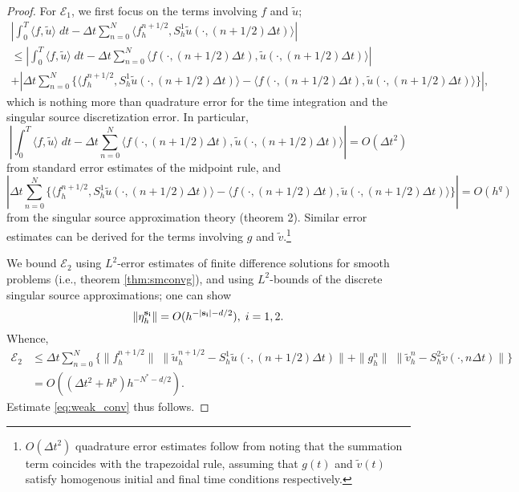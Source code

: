 \begin{proof}
For $\mathcal E_1$, we first focus on the terms involving $f$ and $\tilde u$;
\begin{equation*}
\begin{split}
	\left| \int_0^T \langle f, \tilde u\rangle \;  dt -
		\Delta t \sum_{n=0}^N \langle f_h^{n+1/2}, S_{h}^1\tilde u(\cdot,(n+1/2)\Delta t)\rangle \right| \\
	\le
	\left| \int_0^T \langle f,\tilde u \rangle \; dt - \Delta t \sum_{n=0}^N \langle f(\cdot,(n+1/2)\Delta t),\tilde u(\cdot,(n+1/2)\Delta t)\rangle \right| \\
	+ \left| \Delta t \sum_{n=0}^N \Big\{ \langle f_h^{n+1/2}, S_{h}^1\tilde u(\cdot,(n+1/2)\Delta t)\rangle - 
							     \langle f(\cdot,(n+1/2)\Delta t), \tilde u(\cdot,(n+1/2)\Delta t) \rangle \Big\} \right |,
\end{split}
\end{equation*}
which is nothing more than quadrature error for the time integration and the singular source discretization error.
In particular,
\[
	\left| \int_0^T \langle f,\tilde u \rangle \; dt - \Delta t \sum_{n=0}^N \langle f(\cdot,(n+1/2)\Delta t),\tilde u(\cdot,(n+1/2)\Delta t)\rangle \right| = O(\Delta t^2)
\]
from standard error estimates of the midpoint rule, and
\[
	\left| \Delta t \sum_{n=0}^N \Big\{ \langle f_h^{n+1/2}, S_{h}^1\tilde u(\cdot,(n+1/2)\Delta t)\rangle - 
							     \langle f(\cdot,(n+1/2)\Delta t), \tilde u(\cdot,(n+1/2)\Delta t) \rangle \Big\} \right |
	= O(h^q)
\]
from the singular source approximation theory (theorem 2).
Similar error estimates can be derived for the terms involving $g$ and $\tilde v$.\footnote{$O(\Delta t^2)$ quadrature error estimates follow from noting that the summation term coincides with the trapezoidal rule, assuming that $g(t)$ and $\tilde v(t)$ satisfy homogenous initial and final time conditions respectively.}

We bound $\mathcal E_2$ using $L^2$-error estimates of finite difference solutions for smooth problems (i.e., theorem \ref{thm:smconvg}), and using $L^2$-bounds of the discrete singular source approximations; one can show
\[
 	\| \eta_h^{\bf s_{\bf i}}\| = O(h^{-|{\bf s_{\bf i}}|-d/2}), \; i=1,2.
\]
Whence,
\begin{equation*}
\begin{split}
	\mathcal E_2 &\le \Delta t \sum_{n=0}^N \Big\{ \|f_h^{n+1/2}\| \; 
				\| \tilde u_h^{n+1/2} - S_h^1 \tilde u(\cdot,(n+1/2)\Delta t) \|
			+ \|g_h^{n}\|  \; \| \tilde v_h^n - S_h^2 \tilde v(\cdot,n\Delta t) \| \Big\}\\
					&= O((\Delta t^2+h^p)h^{-N^*-d/2}).
\end{split}
\end{equation*}
Estimate \ref{eq:weak_conv} thus follows.
\end{proof}

